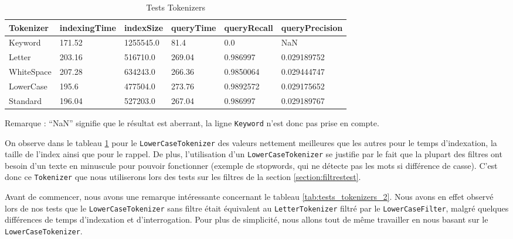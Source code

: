 \begin{table}[!htbp]
    \hspace{-1.5cm}
                \begin{tabular}{|p{2.5cm}|p{2.5cm}|p{2.5cm}|p{2.5cm}|p{2.5cm}|p{2.5cm}|}
                    \hline
                    \textbf{Tokenizer} & \textbf{indexingTime} & \textbf{indexSize} & \textbf{queryTime} & \textbf{queryRecall} & \textbf{queryPrecision}\\
                    \hline     
Keyword & 171.52 & 1255545.0 & 81.4 & 0.0 & NaN\\
		\hline
Letter & 203.16 & 516710.0 & 269.04 & 0.986997 & 0.029189752\\
		\hline
WhiteSpace & 207.28 & 634243.0 & 266.36 & 0.9850064 & 0.029444747\\
		\hline
LowerCase & 195.6 & 477504.0 & 273.76 & 0.9892572 & 0.029175652\\
		\hline
Standard & 196.04 & 527203.0 & 267.04 & 0.986997 & 0.029189767\\
                    \hline
                \end{tabular}
                \caption{Tests Tokenizers}
                \label{tab:tests_tokenizers}
            \end{table}

Remarque : “NaN” signifie que le résultat est aberrant, la ligne \texttt{Keyword} n’est donc pas prise en compte.

On observe dans le tableau \ref{tab:tests_tokenizers} pour le \texttt{LowerCaseTokenizer} des valeurs nettement meilleures que les autres pour le temps d’indexation, la taille de l’index ainsi que pour le rappel. De plus, l'utilisation d'un \texttt{LowerCaseTokenizer} se justifie par le fait que la plupart des filtres ont besoin d'un texte en minuscule pour pouvoir fonctionner (exemple de stopwords, qui ne détecte pas les mots si différence de casse). C’est donc ce \texttt{Tokenizer} que nous utiliserons lors des tests sur les filtres de la section \ref{section:filtrestest}.

Avant de commencer, nous avons une remarque intéressante concernant le tableau \ref{tab:tests_tokenizers_2}. Nous avons en effet observé lors de nos tests que le \texttt{LowerCaseTokenizer} sans filtre était équivalent au \texttt{LetterTokenizer} filtré par le \texttt{LowerCaseFilter}, malgré quelques différences de temps d’indexation et d’interrogation. Pour plus de simplicité, nous allons tout de même travailler en nous basant sur le \texttt{LowerCaseTokenizer}.

